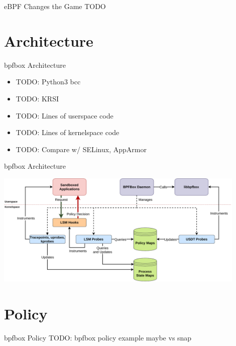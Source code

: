 \documentclass[12pt, dvipsnames]{beamer}
\begin{document}

\begin{frame}[t]{eBPF Changes the Game}
TODO
\end{frame}

\section{Architecture}

\begin{frame}[t]{bpfbox Architecture}
\begin{itemize}
    \item TODO: Python3 bcc
    \item TODO: KRSI
    \item TODO: Lines of userspace code
    \item TODO: Lines of kernelspace code
    \item TODO: Compare w/ SELinux, AppArmor
\end{itemize}
\end{frame}

\begin{frame}[t]{bpfbox Architecture}
\vfill
\begin{center}
    \color{black}
    \includegraphics[width=0.9\textwidth]{figs/bpfbox-overview.pdf}
\end{center}
\vfill
\end{frame}

\section{Policy}

\begin{frame}[t]{bpfbox Policy}
TODO: bpfbox policy example maybe vs snap
\end{frame}
\end{document}
